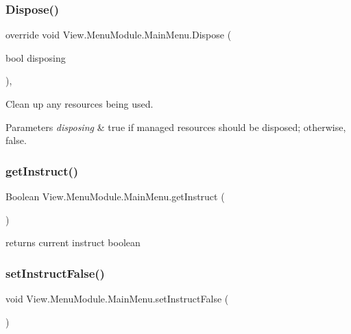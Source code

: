 \subsubsection{\texorpdfstring{Dispose()}{Dispose()}}
{\footnotesize\ttfamily override void View.\+Menu\+Module.\+Main\+Menu.\+Dispose (\begin{DoxyParamCaption}\item[{bool}]{disposing }\end{DoxyParamCaption})\hspace{0.3cm}{\ttfamily [inline]}, {\ttfamily [protected]}}



Clean up any resources being used. 


\begin{DoxyParams}{Parameters}
{\em disposing} & true if managed resources should be disposed; otherwise, false.\\
\hline
\end{DoxyParams}
\hypertarget{class_view_1_1_menu_module_1_1_main_menu_a3f0d5695d821475fc57afed16de39982}{}\label{class_view_1_1_menu_module_1_1_main_menu_a3f0d5695d821475fc57afed16de39982} 
\subsubsection{\texorpdfstring{get\+Instruct()}{getInstruct()}}
{\footnotesize\ttfamily Boolean View.\+Menu\+Module.\+Main\+Menu.\+get\+Instruct (\begin{DoxyParamCaption}{ }\end{DoxyParamCaption})\hspace{0.3cm}{\ttfamily [inline]}}

returns current instruct boolean \hypertarget{class_view_1_1_menu_module_1_1_main_menu_aeead85ef08d2596a89b03f16eb65bc21}{}\label{class_view_1_1_menu_module_1_1_main_menu_aeead85ef08d2596a89b03f16eb65bc21} 
\subsubsection{\texorpdfstring{set\+Instruct\+False()}{setInstructFalse()}}
{\footnotesize\ttfamily void View.\+Menu\+Module.\+Main\+Menu.\+set\+Instruct\+False (\begin{DoxyParamCaption}{ }\end{DoxyParamCaption})\hspace{0.3cm}{\ttfamily [inline]}}

